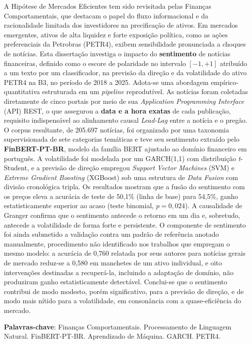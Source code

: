 \begin{resumo}
A Hipótese de Mercados Eficientes tem sido revisitada pelas Finanças Comportamentais, que destacam o papel do fluxo informacional e da racionalidade limitada dos investidores na precificação de ativos. Em mercados emergentes, ativos de alta liquidez e forte exposição política, como as ações preferenciais da Petrobras (PETR4), exibem sensibilidade pronunciada a choques de notícias. Esta dissertação investiga o impacto do \textbf{sentimento} de notícias financeiras, definido como o escore de polaridade no intervalo $[-1,+1]$ atribuído a um texto por um classificador, na previsão da direção e da volatilidade do ativo PETR4 na B3, no período de 2018 a 2025. Adota-se uma abordagem empírico-quantitativa estruturada em um \textit{pipeline} reprodutível. As notícias foram coletadas diretamente de cinco portais por meio de sua \textit{Application Programming Interface} (API) REST, o que assegurou a \textbf{data e a hora exatas} de cada publicação, requisito indispensável ao alinhamento causal \textit{Lead-Lag} entre a notícia e o pregão. O corpus resultante, de 205.697 notícias, foi organizado por uma taxonomia supervisionada de sete categorias temáticas e teve seu sentimento extraído pelo \textbf{FinBERT-PT-BR}, modelo da família BERT ajustado ao domínio financeiro em português. A volatilidade foi modelada por um GARCH(1,1) com distribuição \textit{t}-Student, e a previsão de direção empregou \textit{Support Vector Machines} (SVM) e \textit{Extreme Gradient Boosting} (XGBoost) sob uma estrutura de \textit{Data Fusion} com divisão cronológica tripla. Os resultados mostram que a fusão do sentimento com os preços eleva a acurácia de teste de 50,1\% (linha de base) para 54,5\%, ganho estatisticamente superior ao acaso (teste binomial, $p=0{,}024$). A causalidade de Granger confirma que o sentimento antecede o retorno em um dia e, sobretudo, antecede a volatilidade de forma forte e persistente. O componente de sentimento foi ainda submetido a validação contra um padrão de referência anotado manualmente, procedimento não identificado nos trabalhos que empregam o mesmo modelo: a acurácia de 0,760 relatada por seus autores para notícias gerais de mercado reduz-se a 0,580 em manchetes de um ativo individual, e oito intervenções destinadas a recuperá-la, incluindo a adaptação de domínio, não produziram ganho estatisticamente detectável. Conclui-se que o sentimento contribui de modo modesto, porém significativo, para a previsão de direção, e de modo mais nítido para a volatilidade, em consonância com a quase-eficiência do mercado.

\vspace{\onelineskip}
\noindent
\textbf{Palavras-chave}: Finanças Comportamentais. Processamento de Linguagem Natural. FinBERT-PT-BR. Aprendizado de Máquina. GARCH. PETR4.
\end{resumo}

